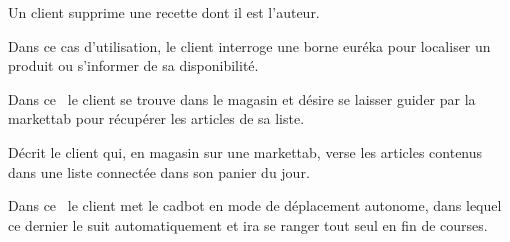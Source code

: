 Un client supprime une recette dont il est l'auteur.

Dans ce cas d'utilisation, le client interroge une borne euréka pour localiser un produit ou s'informer de sa disponibilité.

Dans ce \cu\ le client se trouve dans le magasin et désire se laisser guider par la markettab pour récupérer les articles de sa liste.

Décrit le client qui, en magasin sur une markettab, verse les articles contenus dans une liste connectée dans son panier du jour.

Dans ce \cu\ le client met le cadbot en mode de déplacement autonome, dans lequel ce dernier le suit automatiquement et ira se ranger tout seul en fin de courses.
\par
